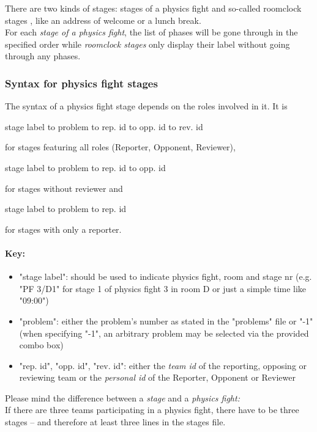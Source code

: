 \documentclass[11pt]{ltxdoc}
\def\highlight#1{%
    \colorbox{red!15}{#1}%
    \index{\textsf{#1}}}
\newlength{\ccharwidth}
\def\tab{\hbox to \ccharwidth {{\rmfamily\small\mapsto}}}
\begin{document}
    
    There are two kinds of stages: stages of a physics fight and so-called \highlight{roomclock stages}, like an address of welcome or a lunch break. \\
    For each \textit{stage of a physics fight}, the list of phases will be gone through in the specified order while \textit{roomclock stages} only display their label without going through any phases.

    
    \subsubsection*{Syntax for physics fight stages}
    The syntax of a physics fight stage depends on the roles involved in it. It is
    \begin{center}\ttfamily
        stage label  \tab problem  \tab rep. id  \tab opp. id  \tab rev. id
    \end{center}
    for stages featuring all roles (Reporter, Opponent, Reviewer),
    \begin{center}\ttfamily
        stage label  \tab problem  \tab rep. id  \tab opp. id
    \end{center}
    for stages without reviewer and
    \begin{center}\ttfamily
        stage label  \tab problem  \tab rep. id
    \end{center}
    for stages with only a reporter.
    
    
    \paragraph{Key:}
    \begin{itemize}
        \item
            "stage label": should be used to indicate physics fight, room and stage nr (e.g. "PF 3/D1" for stage 1 of physics fight 3 in room D or just a simple time like "09:00")
        \item
            "problem": either the problem's number as stated in the "problems" file or "-1" (when specifying "-1", an arbitrary problem may be selected via the provided combo box)
 
        \item
            "rep. id", "opp. id", "rev. id": either the \textit{team id} of the reporting, opposing or reviewing team or the \textit{personal id} of the Reporter, Opponent or Reviewer
    \end{itemize}
    
    \medskip
    Please mind the difference between a \textit{stage} and a \textit{physics fight:} \\
    If there are three teams participating in a physics fight, there have to be three stages -- and therefore at least three lines in the stages file.
    
\end{document}
